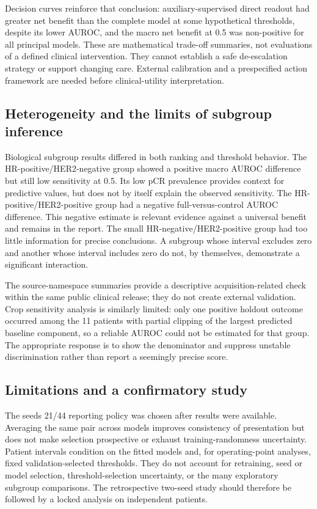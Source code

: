 Decision curves reinforce that conclusion: auxiliary-supervised direct readout had greater net benefit than the complete model at some hypothetical thresholds, despite its lower AUROC, and the macro net benefit at 0.5 was non-positive for all principal models. These are mathematical trade-off summaries, not evaluations of a defined clinical intervention. They cannot establish a safe de-escalation strategy or support changing care. External calibration and a prespecified action framework are needed before clinical-utility interpretation.

\subsection{Heterogeneity and the limits of subgroup inference}
Biological subgroup results differed in both ranking and threshold behavior. The HR-positive/HER2-negative group showed a positive macro AUROC difference but still low sensitivity at 0.5. Its low pCR prevalence provides context for predictive values, but does not by itself explain the observed sensitivity. The HR-positive/HER2-positive group had a negative full-versus-control AUROC difference. This negative estimate is relevant evidence against a universal benefit and remains in the report. The small HR-negative/HER2-positive group had too little information for precise conclusions. A subgroup whose interval excludes zero and another whose interval includes zero do not, by themselves, demonstrate a significant interaction.

The source-namespace summaries provide a descriptive acquisition-related check within the same public clinical release; they do not create external validation. Crop sensitivity analysis is similarly limited: only one positive holdout outcome occurred among the 11 patients with partial clipping of the largest predicted baseline component, so a reliable AUROC could not be estimated for that group. The appropriate response is to show the denominator and suppress unstable discrimination rather than report a seemingly precise score.

\subsection{Limitations and a confirmatory study}
\label{sec:limitations}
The seeds 21/44 reporting policy was chosen after results were available. Averaging the same pair across models improves consistency of presentation but does not make selection prospective or exhaust training-randomness uncertainty. Patient intervals condition on the fitted models and, for operating-point analyses, fixed validation-selected thresholds. They do not account for retraining, seed or model selection, threshold-selection uncertainty, or the many exploratory subgroup comparisons. The retrospective two-seed study should therefore be followed by a locked analysis on independent patients.

